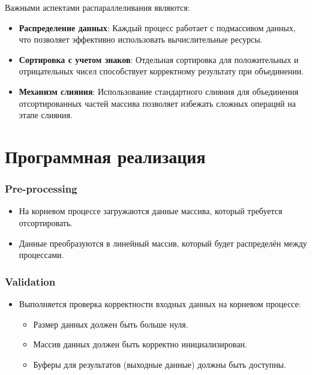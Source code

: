 \documentclass[12pt]{article}
\begin{document}
\hspace*{1.25em}Важными аспектами распараллеливания являются:
\begin{itemize}
    \item \textbf{Распределение данных}: Каждый процесс работает с подмассивом данных, что позволяет эффективно использовать вычислительные ресурсы.
    \item \textbf{Сортировка с учетом знаков}: Отдельная сортировка для положительных и отрицательных чисел способствует корректному результату при объединении.
    \item \textbf{Механизм слияния}: Использование стандартного слияния для объединения отсортированных частей массива позволяет избежать сложных операций на этапе слияния.
\end{itemize}




\section{Программная реализация}


\subsubsection*{Pre-processing}
\begin{itemize}
    \item На корневом процессе загружаются данные массива, который требуется отсортировать.
    \item Данные преобразуются в линейный массив, который будет распределён между процессами.
\end{itemize}

\subsubsection*{Validation}
\begin{itemize}
    \item Выполняется проверка корректности входных данных на корневом процессе:
    \begin{itemize}
        \item Размер данных должен быть больше нуля.
        \item Массив данных должен быть корректно инициализирован.
        \item Буферы для результатов (выходные данные) должны быть доступны.
    \end{itemize}
\end{itemize}
\end{document}
